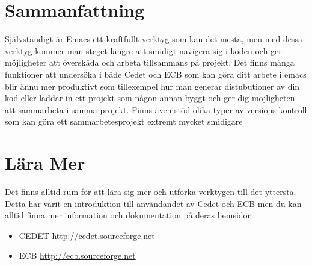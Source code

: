 \documentclass[12pt]{article} %
\begin{document}

\section{Sammanfattning}
Självständigt är Emacs ett kraftfullt verktyg som kan det mesta, men med dessa verktyg kommer man steget längre att smidigt navigera sig i koden och ger möjligheter att överskåda och arbeta tillsammans på projekt. 
Det finns många funktioner att undersöka i både Cedet och ECB som kan göra ditt arbete i emacs blir ännu mer produktivt som tillexempel hur man generar distubutioner av din kod eller laddar in ett projekt som någon annan byggt och ger dig möjligheten att sammarbeta i samma projekt. Finns även stöd olika typer av versions kontroll som kan göra ett sammarbetesprojekt extremt mycket smidigare 

\section{Lära Mer} 
Det finns alltid rum för att lära sig mer och utforka verktygen till det yttersta. Detta har varit en introduktion till användandet av Cedet och ECB men du kan alltid finna mer information och dokumentation på deras hemsidor
\begin{itemize}
\item{CEDET} \url{http://cedet.sourceforge.net}
\item{ECB} \url{http://ecb.sourceforge.net}
\end{itemize}


\end{document}
